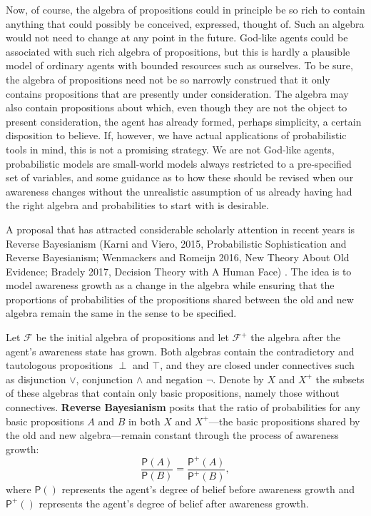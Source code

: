 \documentclass[
  11pt,
  dvipsnames,enabledeprecatedfontcommands]{scrartcl}
\newcommand{\pr}[1]{\ensuremath{\mathsf{P}(#1)}}
\newcommand{\ppr}[2]{\ensuremath{\mathsf{P}^{#1}(#2)}}
\begin{document}
Now, of course, the algebra of propositions could in principle be so
rich to contain anything that could possibly be conceived, expressed,
thought of. Such an algebra would not need to change at any point in the
future. God-like agents could be associated with such rich algebra of
propositions, but this is hardly a plausible model of ordinary agents
with bounded resources such as ourselves. To be sure, the algebra of
propositions need not be so narrowly construed that it only contains
propositions that are presently under consideration. The algebra may
also contain propositions about which, even though they are not the
object to present consideration, the agent has already formed, perhaps
simplicity, a certain disposition to believe. If, however, we have
actual applications of probabilistic tools in mind, this is not a
promising strategy. We are not God-like agents, probabilistic models are
small-world models always restricted to a pre-specified set of
variables, and some guidance as to how these should be revised when our
awareness changes without the unrealistic assumption of us already
having had the right algebra and probabilities to start with is
desirable.

A proposal that has attracted considerable scholarly attention in recent
years is Reverse Bayesianism (Karni and Viero, 2015, Probabilistic
Sophistication and Reverse Bayesianism; Wenmackers and Romeijn 2016, New
Theory About Old Evidence; Bradely 2017, Decision Theory with A Human
Face) . The idea is to model awareness growth as a change in the algebra
while ensuring that the proportions of probabilities of the propositions
shared between the old and new algebra remain the same in the sense to
be specified.

Let \(\mathcal{F}\) be the initial algebra of propositions and let
\(\mathcal{F}^+\) the algebra after the agent's awareness state has
grown. Both algebras contain the contradictory and tautologous
propositions \(\perp\) and \(\top\), and they are closed under
connectives such as disjunction \(\vee\), conjunction \(\wedge\) and
negation \(\neg\). Denote by \(X\) and \(X^+\) the subsets of these
algebras that contain only basic propositions, namely those without
connectives. \textbf{Reverse Bayesianism} posits that the ratio of
probabilities for any basic propositions \(A\) and \(B\) in both \(X\)
and \(X^+\)---the basic propositions shared by the old and new
algebra---remain constant through the process of awareness growth:
\[\frac{\pr{A}}{\pr{B}} = \frac{\ppr{+}{A}}{\ppr{+}{B}},\] where
\(\pr{}\) represents the agent's degree of belief before awareness
growth and \(\ppr{+}{}\) represents the agent's degree of belief after
awareness growth.
\end{document}
